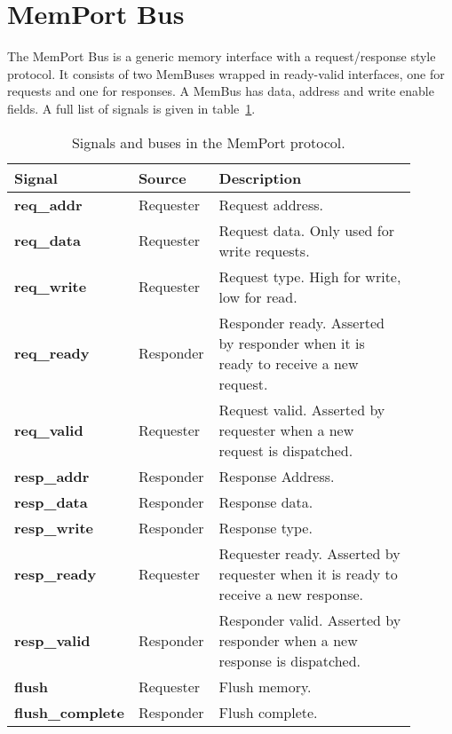 \clearpage


\section{MemPort Bus}

The MemPort Bus is a generic memory interface with a request/response style
protocol. It consists of two MemBuses wrapped in ready-valid interfaces, one for
requests and one for responses. A MemBus has data, address and write enable fields.
A full list of signals is given in table~\ref{tbl:memport-signals}.

\begin{table}[H]
    \begin{tabular}{p{0.2\linewidth}|p{0.2\linewidth}|p{0.5\linewidth}}
    \hline
    Signal          & Source    & Description                                                                        \\ \hline
    \textbf{req\_addr}       & Requester & Request address.                                                                   \\ \hline
    \textbf{req\_data}       & Requester & Request data. Only used for write requests.                                        \\ \hline
    \textbf{req\_write}      & Requester & Request type. High for write, low for read.                                        \\ \hline
    \textbf{req\_ready}      & Responder & Responder ready. Asserted by responder when it is ready to receive a new request.  \\ \hline
    \textbf{req\_valid}      & Requester & Request valid. Asserted by requester when a new request is dispatched.             \\ \hline
    \textbf{resp\_addr}      & Responder & Response Address.                                                                  \\ \hline
    \textbf{resp\_data}      & Responder & Response data.                                                                     \\ \hline
    \textbf{resp\_write}     & Responder & Response type.                                                                     \\ \hline
    \textbf{resp\_ready}     & Requester & Requester ready. Asserted by requester when it is ready to receive a new response. \\ \hline
    \textbf{resp\_valid}     & Responder & Responder valid. Asserted by responder when a new response is dispatched.          \\ \hline
    \textbf{flush}           & Requester & Flush memory.                                                                      \\ \hline
    \textbf{flush\_complete} & Responder & Flush complete.                                                                    \\ \hline
    \end{tabular}
    \caption{Signals and buses in the MemPort protocol.}
    \label{tbl:memport-signals}
\end{table}